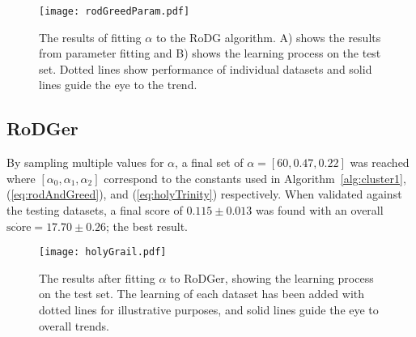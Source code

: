 \begin{figure}[H]
    \begin{center}
        \texttt{[image: rodGreedParam.pdf]}
        \caption[RoD with Greed]{The results of fitting $\alpha{}$ to the RoDG algorithm. A) shows the results from parameter fitting and B) shows the learning process on the test set. Dotted lines show performance of individual datasets and solid lines guide the eye to the trend.}
        \label{fig:rogreed}
    \end{center}
\end{figure}


\subsection[Region of Disagreement with Greed and Clusters]{RoDGer}
By sampling multiple values for $\alpha$, a final set of $\alpha=[60, 0.47, 0.22]$ was reached where $[\alpha{}_0, \alpha{}_1, \alpha{}_2]$ correspond to the constants used in Algorithm~\ref{alg:cluster1}, (\ref{eq:rodAndGreed}), and (\ref{eq:holyTrinity}) respectively. When validated against the testing datasets, a final score of $0.115\pm{}0.013$ was found with an overall $\dot{\mathrm{score}}=17.70\pm{}0.26$; the best result.

\begin{figure}[H]
    \begin{center}
        \texttt{[image: holyGrail.pdf]}
        \caption[RoDGer Test Results]{The results after fitting $\alpha{}$ to RoDGer, showing the learning process on the test set. The learning of each dataset has been added with dotted lines for illustrative purposes, and solid lines guide the eye to overall trends.}
        \label{fig:holyTrinity}
    \end{center}
\end{figure}